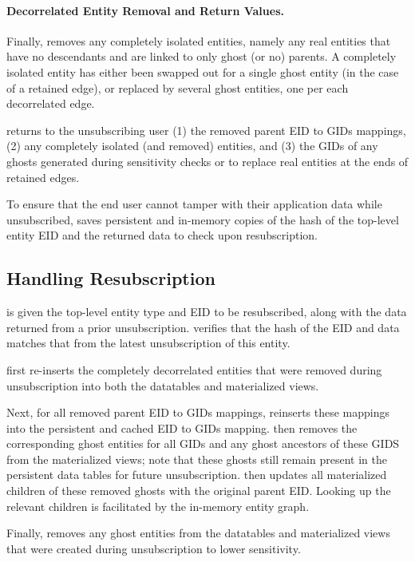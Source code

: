 \paragraph{Decorrelated Entity Removal and Return Values.}
Finally, \sys removes any completely isolated entities, namely any real entities that have no
descendants and are linked to only ghost (or no) parents. A completely isolated entity has either been swapped
out for a single ghost entity (in the case of a retained edge), or replaced by several ghost
entities, one per each decorrelated edge.

\sys returns to the unsubscribing user (1) the removed parent EID to GIDs mappings, (2) any
completely isolated (and removed) entities,
and (3) the GIDs of any ghosts generated during sensitivity checks or to replace real
entities at the ends of retained edges.

To ensure that the end user cannot tamper with their application data while unsubscribed, \sys saves
persistent and in-memory copies of the hash of the top-level entity EID and the returned data to
check upon resubscription.

\subsection{Handling Resubscription}
\sys is given the top-level entity type and EID to be resubscribed, along with the data returned
from a prior unsubscription.
\sys verifies that the hash of the EID and data matches that from the latest unsubscription of
this entity.

\sys first re-inserts the completely decorrelated entities that were removed during unsubscription
into both the datatables and materialized views. 

Next, for all removed parent EID to GIDs mappings, \sys reinserts these mappings into the
persistent and cached EID to GIDs mapping.
\sys then removes the corresponding ghost entities for all GIDs and any ghost ancestors of these
GIDS from the materialized views; note that these ghosts still remain present in the
persistent data tables for future unsubscription.
\sys then updates all materialized children of these removed ghosts with the original parent EID. Looking up the relevant
children is facilitated by the in-memory entity graph. 

Finally, \sys removes any
ghost entities from the datatables and materialized views that were created during unsubscription to
lower sensitivity.

